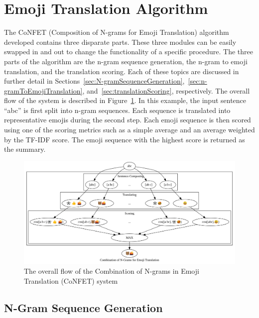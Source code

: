 \documentclass{article}[10]
\begin{document}
\section{Emoji Translation Algorithm\label{sec:EmojiTranslationAlgorithm}}

The CoNFET (Composition of N-grams for Emoji Translation) algorithm developed
contains three disparate parts. These three modules can be easily swapped in and
out to change the functionality of a specific procedure. The three parts of the
algorithm are the n-gram sequence generation, the n-gram to emoji translation,
and the translation scoring. Each of these topics are discussed in further
detail in
Sections~\ref{sec:N-gramSequenceGeneration},~\ref{sec:n-gramToEmojiTranslation},
and~\ref{sec:translationScoring}, respectively. The overall flow of the system
is described in Figure~\ref{fig:flow}. In this example, the input sentence
``abc'' is first split into n-gram sequences. Each sequence is translated into
representative emojis during the second step. Each emoji sequence is then scored
using one of the scoring metrics such as a simple average and an average
weighted by the TF-IDF score. The emoji sequence with the highest score is
returned as the summary.

\begin{figure}[h]
  \begin{center}
    \includegraphics[width=1.0\textwidth]{figures/flow.png}
    \caption{The overall flow of the Combination of N-grams in Emoji Translation
      (CoNFET) system\label{fig:flow}}
  \end{center}
\end{figure}

\subsection{N-Gram Sequence Generation\label{sec:N-gramSequenceGeneration}}
\end{document}

